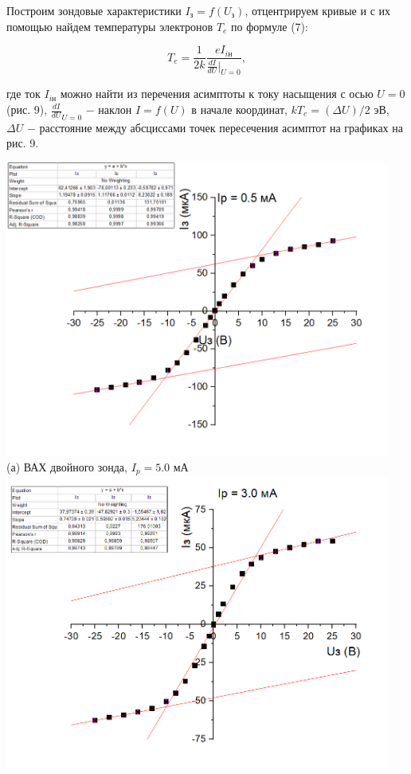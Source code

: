 \documentclass[a4paper,12pt]{article} %
\begin{document}
\hfill \break Построим зондовые характеристики $I_\text{з} = f(U_\text{з})$, отцентрируем кривые и с их помощью найдем температуры электронов $T_{e}$ по формуле (7):

$$
T_{e} = \frac{1}{2k} \frac{eI_{i\text{н}}}{\frac{dI}{dU}|_{U=0}},
$$

\hfill \break где ток $I_{i\text{н}}$ можно найти из перечения асимптоты к току насыщения с осью $U = 0$ (рис. 9), $\frac{dI}{dU}_{U=0}$ $-$ наклон $I = f(U)$ в начале координат, $kT_{e} = (\Delta U)/2$ эВ, $\Delta U$ $-$ расстояние между абсциссами точек пересечения асимптот на графиках на рис. 9. 

\begin{center}
\includegraphics[width=0.95\textwidth]{3.5.1_9.png}\\
(а) ВАХ двойного зонда, $I_{p} = 5.0$ мА  \\
\includegraphics[width=0.95\textwidth]{3.5.1_10.png}\\

\end{center}
\end{document}
